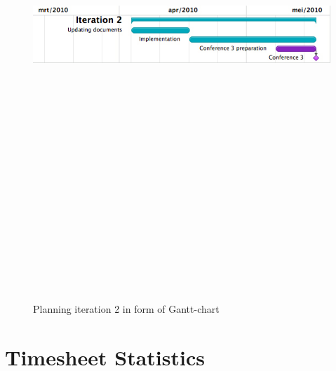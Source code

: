 \documentclass[salesmen, twoside]{../../../templates/latex/2009/softproj}
\begin{document}
\begin{projdoc}
				\begin{figure}
					\begin{center}
					\includegraphics[angle=90, height=20cm]{../../img/gantt-chart-2iter.jpg}
					\caption{Planning iteration 2 in form of Gantt-chart}
				\end{center}
				\end{figure}
		

\appendix
\chapter{Timesheet Statistics}
\label{appendix:statistics}


\end{projdoc}
\end{document}
